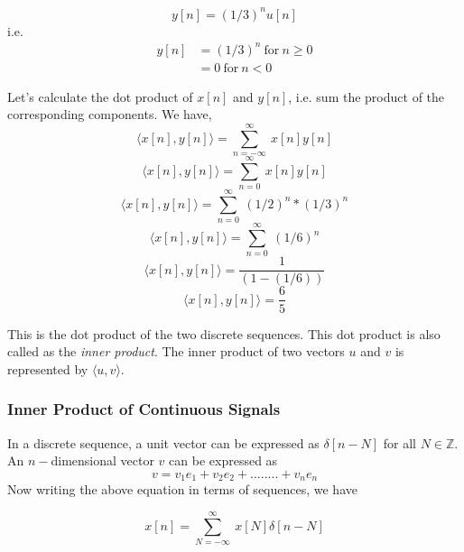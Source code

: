 \begin{equation*}
  y[n] = (1/3)^nu[n]
\end{equation*}
i.e. 
\begin{align*}
  y[n] &= (1/3)^n \ \text{for} \ n\geq0 \\
  &= 0 \ \text{for} \ n<0
\end{align*}
                  
                  
  Let's calculate the dot product of $x[n]$ and $y[n]$, i.e. sum the product of the corresponding components.
  We have,
   \begin{equation*} \langle x[n],y[n] \rangle = \sum_{n=-\infty}^{\infty}\ x[n]y[n]\end{equation*} 
   \begin{equation*} \langle x[n],y[n] \rangle = \sum_{n=0}^{\infty}\ x[n]y[n]\end{equation*} 
   \begin{equation*} \langle x[n],y[n] \rangle = \sum_{n=0}^{\infty}\ (1/2)^n*(1/3)^n\end{equation*} 
   \begin{equation*} \langle x[n],y[n] \rangle = \sum_{n=0}^{\infty}\ (1/6)^n\end{equation*} 
   \begin{equation*} \langle x[n],y[n] \rangle = \frac{1}{(1-(1/6))}\end{equation*} 
   \begin{equation*} \langle x[n],y[n] \rangle = \frac{6}{5}\end{equation*} 
  		
          
 	This is the dot product of the two discrete sequences. This dot product is also called as the \emph{inner product}. The inner product of two vectors $u$ and $v$ is represented by $\langle u,v \rangle$.

\subsubsection{Inner Product of Continuous Signals}
       In a discrete sequence, a unit vector can be expressed as $\delta[n-N]$ for all $N \in \mathbb{Z}$. An $n-$dimensional vector $v$ can be expressed as
        \begin{equation*}v = v_1e_1 + v_2e_2 + ........ + v_ne_n\end{equation*}
        Now writing the above equation in terms of sequences, we have
       
    	\begin{equation*}	x[n] = 	\sum_{N=-\infty}^{\infty}\ x[N]\delta[n-N]\end{equation*}
            
